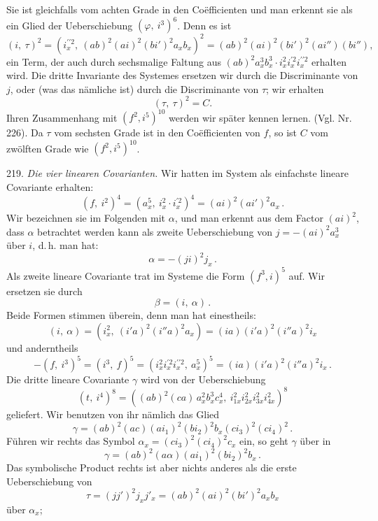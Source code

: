 \documentclass[11pt]{article}
\providecommand{\weberpage}[1]{}
\providecommand{\weq}[2]{\begin{equation}\tag{#1}#2\end{equation}}
\begin{document}
\weberpage{245}
Sie ist gleichfalls vom achten Grade in den Co\"efficienten und man erkennt sie als ein Glied der Ueberschiebung $(\varphi,\ i^3)^6$. Denn es ist
\[
(i,\ \tau)^2 = (i_x^{\prime\prime 2},\ (ab)^2(ai)^2(bi')^2 a_x b_x)^2 = (ab)^2(ai)^2(bi')^2(ai'')(bi''),
\]
ein Term, der auch durch sechsmalige Faltung aus $(ab)^2 a_x^3 b_x^3 \cdot i_x^2 i_x^{\prime 2} i_x^{\prime\prime 2}$ erhalten wird. Die dritte Invariante des Systemes ersetzen wir durch die Discriminante von $j$, oder (was das n\"amliche ist) durch die Discriminante von $\tau$; wir erhalten
\[
(\tau,\ \tau)^2 = C.
\]
Ihren Zusammenhang mit $(f^2, i^5)^{10}$ werden wir sp\"ater kennen lernen. (Vgl. Nr. 226). Da $\tau$ vom sechsten Grade ist in den Co\"efficienten von $f$, so ist $C$ vom zw\"olften Grade wie $(f^2, i^5)^{10}$.

219. \textit{Die vier linearen Covarianten.} Wir hatten im System als einfachste lineare Covariante erhalten:
\weq{1}{(f,\ i^2)^4 = (a_x^5,\ i_x^2 \cdot i_x^{\prime 2})^4 = (ai)^2(ai')^2 a_x\,.}
Wir bezeichnen sie im Folgenden mit $\alpha$, und man erkennt aus dem Factor $(ai)^2$, dass $\alpha$ betrachtet werden kann als zweite Ueberschiebung von $j = -(ai)^2 a_x^3$ \"uber $i$, d.\,h. man hat:
\[
\alpha = -(ji)^2 j_x\,.
\]
Als zweite lineare Covariante trat im Systeme die Form $(f^3, i)^5$ auf. Wir ersetzen sie durch
\weq{2}{\beta = (i,\ \alpha)\,.}
Beide Formen stimmen \"uberein, denn man hat einestheils:
\[
(i,\ \alpha) = (i_x^2,\ (i'a)^2(i''a)^2 a_x) = (ia)(i'a)^2(i''a)^2 i_x
\]
und anderntheils
\[
-(f,\ i^3)^5 = (i^3,\ f)^5 = (i_x^2 i_x^{\prime 2} i_x^{\prime\prime 2},\ a_x^5)^5 = (ia)(i'a)^2(i''a)^2 i_x\,.
\]
Die dritte lineare Covariante $\gamma$ wird von der Ueberschiebung
\[
(t,\ i^4)^8 = ((ab)^2(ca)\,a_x^2 b_x^3 c_x^4,\ i_{1x}^2 i_{2x}^2 i_{3x}^2 i_{4x}^2)^8
\]
geliefert. Wir benutzen von ihr n\"amlich das Glied
\[
\gamma = (ab)^2(ac)(ai_1)^2(bi_2)^2 b_x (ci_3)^2(ci_4)^2\,.
\]
F\"uhren wir rechts das Symbol $\alpha_x = (ci_3)^2(ci_4)^2 c_x$ ein, so geht $\gamma$ \"uber in
\[
\gamma = (ab)^2(a\alpha)(ai_1)^2(bi_2)^2 b_x\,.
\]
Das symbolische Product rechts ist aber nichts anderes als die erste Ueberschiebung von
\[
\tau = (jj')^2 j_x j'_x = (ab)^2(ai)^2(bi')^2 a_x b_x
\]
\"uber $\alpha_x$;
\end{document}
